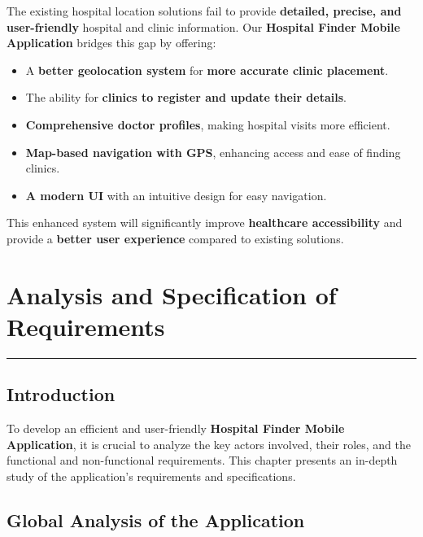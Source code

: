 \documentclass[12pt]{report}
\begin{document}
The existing hospital location solutions fail to provide \textbf{detailed, precise, and user-friendly} hospital and clinic information. Our \textbf{Hospital Finder Mobile Application} bridges this gap by offering:
\begin{itemize}
	\item A \textbf{better geolocation system} for \textbf{more accurate clinic placement}.
	\item The ability for \textbf{clinics to register and update their details}.
	\item \textbf{Comprehensive doctor profiles}, making hospital visits more efficient.
	\item \textbf{Map-based navigation with GPS}, enhancing access and ease of finding clinics.
	\item \textbf{A modern UI} with an intuitive design for easy navigation.
\end{itemize}

\noindent This enhanced system will significantly improve \textbf{healthcare accessibility} and provide a \textbf{better user experience} compared to existing solutions.











\newpage

\chapter{\textbf{Analysis and Specification of Requirements}}
\rule{\linewidth}{1.5pt}  %

\section{\textbf{Introduction}}

\noindent To develop an efficient and user-friendly \textbf{Hospital Finder Mobile Application}, it is crucial to analyze the key actors involved, their roles, and the functional and non-functional requirements. This chapter presents an in-depth study of the application’s requirements and specifications.

\section{\textbf{Global Analysis of the Application}}
\end{document}
